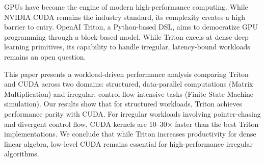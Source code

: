 GPUs have become the engine of modern high-performance computing. While NVIDIA CUDA remains the industry standard, its complexity creates a high barrier to entry. OpenAI Triton, a Python-based DSL, aims to democratize GPU programming through a block-based model. While Triton excels at dense deep learning primitives, its capability to handle irregular, latency-bound workloads remains an open question.

This paper presents a workload-driven performance analysis comparing Triton and CUDA across two domains: structured, data-parallel computations (Matrix Multiplication) and irregular, control-flow intensive tasks (Finite State Machine simulation).
Our results show that for structured workloads, Triton achieves performance parity with CUDA. For irregular workloads involving pointer-chasing and divergent control flow, CUDA kernels are 10--30$\times$ faster than the best Triton implementations. We conclude that while Triton increases productivity for dense linear algebra, low-level CUDA remains essential for high-performance irregular algorithms.
